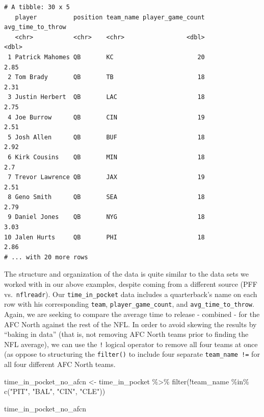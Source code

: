 \documentclass[
  letterpaper,
]{krantz}
\newenvironment{Shaded}{\begin{snugshade}}{\end{snugshade}}
\newcommand{\FunctionTok}[1]{\textcolor[rgb]{0.28,0.35,0.67}{#1}}
\newcommand{\NormalTok}[1]{\textcolor[rgb]{0.00,0.23,0.31}{#1}}
\newcommand{\OtherTok}[1]{\textcolor[rgb]{0.00,0.23,0.31}{#1}}
\newcommand{\SpecialCharTok}[1]{\textcolor[rgb]{0.37,0.37,0.37}{#1}}
\newcommand{\StringTok}[1]{\textcolor[rgb]{0.13,0.47,0.30}{#1}}
\begin{document}
\begin{verbatim}
# A tibble: 30 x 5
   player          position team_name player_game_count avg_time_to_throw
   <chr>           <chr>    <chr>                 <dbl>             <dbl>
 1 Patrick Mahomes QB       KC                       20              2.85
 2 Tom Brady       QB       TB                       18              2.31
 3 Justin Herbert  QB       LAC                      18              2.75
 4 Joe Burrow      QB       CIN                      19              2.51
 5 Josh Allen      QB       BUF                      18              2.92
 6 Kirk Cousins    QB       MIN                      18              2.7 
 7 Trevor Lawrence QB       JAX                      19              2.51
 8 Geno Smith      QB       SEA                      18              2.79
 9 Daniel Jones    QB       NYG                      18              3.03
10 Jalen Hurts     QB       PHI                      18              2.86
# ... with 20 more rows
\end{verbatim}

The structure and organization of the data is quite similar to the data
sets we worked with in our above examples, despite coming from a
different source (PFF vs.~\texttt{nflreadr}). Our
\texttt{time\_in\_pocket} data includes a quarterback's name on each row
with his corresponding \texttt{team}, \texttt{player\_game\_count}, and
\texttt{avg\_time\_to\_throw}. Again, we are seeking to compare the
average time to release - combined - for the AFC North against the rest
of the NFL. In order to avoid skewing the results by ``baking in data''
(that is, not removing AFC North teams prior to finding the NFL
average), we can use the \texttt{!} logical operator to remove all four
teams at once (as oppose to structuring the \texttt{filter()} to include
four separate \texttt{team\_name\ !=} for all four different AFC North
teams.

\begin{Shaded}
\begin{Highlighting}[]
\NormalTok{time\_in\_pocket\_no\_afcn }\OtherTok{\textless{}{-}}\NormalTok{ time\_in\_pocket }\SpecialCharTok{\%\textgreater{}\%}
  \FunctionTok{filter}\NormalTok{(}\SpecialCharTok{!}\NormalTok{team\_name }\SpecialCharTok{\%in\%} \FunctionTok{c}\NormalTok{(}\StringTok{"PIT"}\NormalTok{, }\StringTok{"BAL"}\NormalTok{, }\StringTok{"CIN"}\NormalTok{, }\StringTok{"CLE"}\NormalTok{))}

\NormalTok{time\_in\_pocket\_no\_afcn}
\end{Highlighting}
\end{Shaded}
\end{document}

